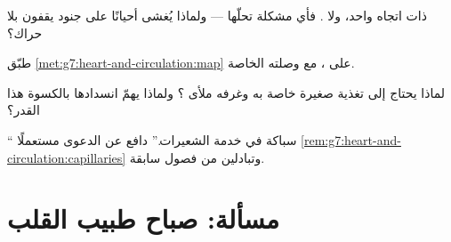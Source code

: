 \begin{exercise}[$\star\star$]\label{exo:g7:heart-and-circulation:9}
  ذات اتجاه واحد، ولا  . فأي مشكلة
تحلّها   --- ولماذا يُغشى أحيانًا على جنود يقفون بلا
حراك؟
\end{exercise}

\begin{exercise}[$\star\star$]\label{exo:g7:heart-and-circulation:10}
طبّق \cref{met:g7:heart-and-circulation:map} على ، مع
وصلته الخاصة.
\end{exercise}

\begin{exercise}[$\star\star$]\label{exo:g7:heart-and-circulation:11}
لماذا يحتاج  إلى  تغذية صغيرة خاصة به وغرفه ملأى
؟ ولماذا يهمّ انسدادها بالكسوة هذا القدر؟
\end{exercise}

\begin{exercise}[$\star\star\star$]\label{exo:g7:heart-and-circulation:12}
`` سباكة في خدمة الشعيرات.'' دافع عن الدعوى مستعملًا
\cref{rem:g7:heart-and-circulation:capillaries} وتبادلين من فصول
سابقة.
\end{exercise}

\section{مسألة: صباح طبيب القلب}

